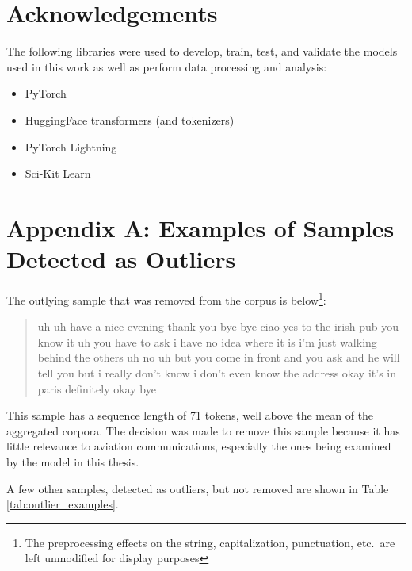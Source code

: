 \documentclass[12pt]{article}
\begin{document}
\newpage
\section{Acknowledgements}
The following libraries were used to develop, train, test, and validate the models used in this work as well as perform data processing and analysis:
\begin{itemize}
    \item PyTorch \cite{paszke_pytorch_2019}
    \item HuggingFace transformers (and tokenizers) \cite{wolf_transformers_2020}
    \item PyTorch Lightning \cite{falcon_pytorchlightning_2019}
    \item Sci-Kit Learn \cite{pedregosa_scikit-learn_2011}
\end{itemize}

\newpage
\section{Appendix A: Examples of Samples Detected as Outliers}\label{sec:appendix_a}
The outlying sample that was removed from the corpus is below\footnote{The preprocessing effects on the string, capitalization, punctuation, etc.~are
    left unmodified for display purposes}:

\begin{quote}
    uh uh have a nice evening thank you bye bye ciao yes to the irish pub you know it uh you have to ask i have no idea where it is i'm just walking
    behind the others uh no uh but you come in front and you ask and he will tell you but i really don't know i don't even know the address okay it's
    in paris definitely okay bye
\end{quote}

This sample has a sequence length of 71 tokens, well above the mean of the aggregated corpora. The decision was made to remove this sample because
it has little relevance to aviation communications, especially the ones being examined by the model in this thesis.

A few other samples, detected as outliers, but not removed are shown in Table \ref{tab:outlier_examples}.
\end{document}
